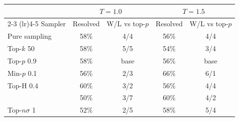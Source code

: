 \begin{tabular}{lcccc}
\toprule
 & \multicolumn{2}{c}{$T{=}1.0$} & \multicolumn{2}{c}{$T{=}1.5$} \\
\cmidrule(lr){2-3} \cmidrule(lr){4-5}
Sampler & Resolved & W/L vs top-$p$ & Resolved & W/L vs top-$p$ \\
\midrule
Pure sampling & 58\% & 4/4 & 56\% & 4/4 \\
Top-$k$ 50 & 58\% & 5/5 & 54\% & 3/4 \\
Top-$p$ 0.9 & 58\% & base & 56\% & base \\
Min-$p$ 0.1 & 56\% & 2/3 & 66\% & 6/1 \\
Top-H 0.4 & 60\% & 3/2 & 56\% & 4/4 \\
\pless{} & 50\% & 3/7 & 60\% & 4/2 \\
Top-$n\sigma$ 1 & 52\% & 2/5 & 58\% & 5/4 \\
\bottomrule
\end{tabular}
